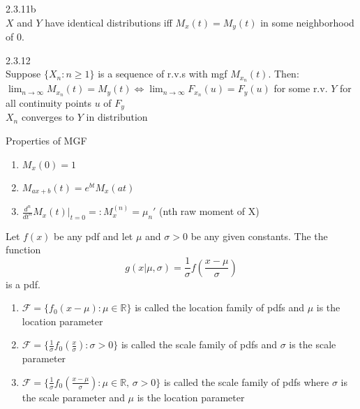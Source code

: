 \documentclass[14pt, oneside, letterpaper, fleqn]{notes}
\begin{document}
\begin{theorem} 2.3.11b \\
$X$ and $Y$ have identical distributions iff $M_x(t) = 
M_y(t)$ in some neighborhood of 0.
\end{theorem}

\begin{theorem} 2.3.12 \\
Suppose $\{X_n: n\geq 1\}$ is a sequence of r.v.s with mgf
$M_{x_n}(t)$.  Then: \\
$\lim_{n \to \infty}M_{x_n}(t) = M_y(t) \iff 
\lim_{n \to \infty}F_{x_n}(u) = F_y(u)$ for some r.v. $Y$
for all continuity points $u$ of $F_y$ \\
$X_n$ converges to $Y$ in distribution
\end{theorem}

\begin{remark} Properties of MGF 
\begin{enumerate}
\item $M_x(0) = 1$
\item $M_{ax+b}(t) = e^{bt}M_x(at)$
\item $\frac{d^n}{dt^n}M_x(t) \rvert_{t=0} =: M_x^{(n)} = 
\mu_{n}'$ (nth raw moment of X)
\end{enumerate}
\end{remark}

%
%

\begin{theorem}
Let $f(x)$ be any pdf and let $\mu$ and $\sigma > 0$ be any 
given constants.  The the function
\[
g(x|\mu,\sigma) = \frac{1}{\sigma}f(\frac{x-\mu}{\sigma})
\]
is a pdf.
\end{theorem}

\begin{enumerate}
\item $\mathscr{F} = \{f_0(x-\mu): \mu \in \mathbb{R} \}$ 
is called the location family of pdfs and $\mu$ is the 
location parameter

\item $\mathscr{F} = \{\frac{1}{\sigma}f_0(\frac{x}{\sigma})
: \sigma > 0 \}$ is called the scale family of pdfs
and $\sigma$ is the scale parameter

\item $\mathscr{F} = \{\frac{1}{\sigma}f_0
(\frac{x - \mu}{\sigma}) : \mu \in \mathbb{R} \text{, } 
\sigma > 0 \}$  is called the scale family of pdfs where 
$\sigma$ is the scale parameter and $\mu$ is the location
parameter
\end{enumerate}
\end{document}
